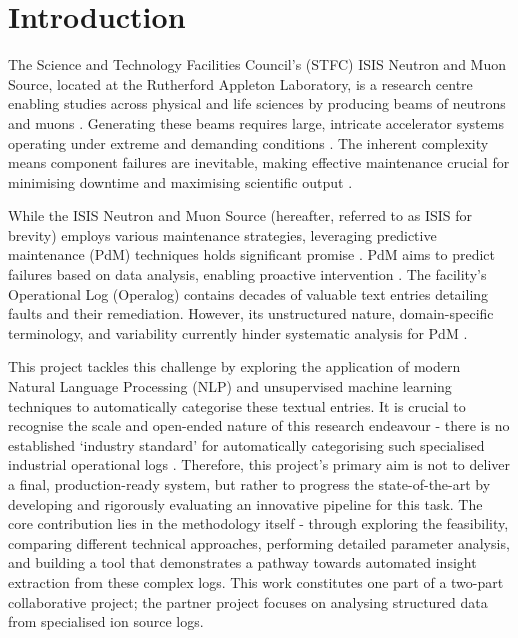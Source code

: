 \documentclass[10pt,oneside]{report}
\begin{document}

\clearpage



\chapter{Introduction}

The Science and Technology Facilities Council's (STFC) ISIS Neutron and Muon Source, located at the Rutherford Appleton Laboratory, is a research centre enabling studies across physical and life sciences by producing beams of neutrons and muons \cite{thomason2019isis}. Generating these beams requires large, intricate accelerator systems operating under extreme and demanding conditions \cite{2021practicalguide}. The inherent complexity means component failures are inevitable, making effective maintenance crucial for minimising downtime and maximising scientific output \cite{thomason2019isis}.

While the ISIS Neutron and Muon Source (hereafter, referred to as ISIS for brevity) employs various maintenance strategies, leveraging predictive maintenance (PdM) techniques holds significant promise \cite{thomason2019isis, susto2012predictive}. PdM aims to predict failures based on data analysis, enabling proactive intervention \cite{carvalho2019systematic}. The facility's Operational Log (Operalog) contains decades of valuable text entries detailing faults and their remediation. However, its unstructured nature, domain-specific terminology, and variability currently hinder systematic analysis for PdM \cite{usuga2022using}.


This project tackles this challenge by exploring the application of modern Natural Language Processing (NLP) and unsupervised machine learning techniques to automatically categorise these textual entries. It is crucial to recognise the scale and open-ended nature of this research endeavour - there is no established `industry standard' for automatically categorising such specialised industrial operational logs \cite{carvalho2019systematic}. Therefore, this project's primary aim is not to deliver a final, production-ready system, but rather to progress the state-of-the-art by developing and rigorously evaluating an innovative pipeline for this task. The core contribution lies in the methodology itself - through exploring the feasibility, comparing different technical approaches, performing detailed parameter analysis, and building a tool that demonstrates a pathway towards automated insight extraction from these complex logs. This work constitutes one part of a two-part collaborative project; the partner project focuses on analysing structured data from specialised ion source logs.
\end{document}
